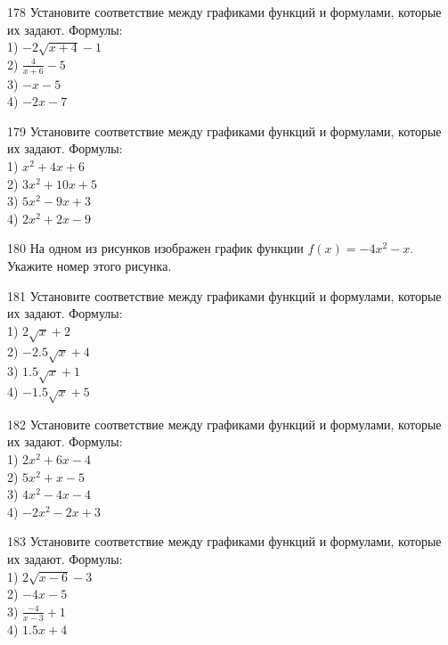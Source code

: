 \documentclass[4apaper]{article}
\begin{document}
\begin{taskBN}{178}
Установите соответствие между графиками функций и формулами, которые их задают. Формулы: \\1) $-2\sqrt{x+4}-1$\\2) $\frac{4}{x+6}-5$\\3) $-x-5$\\4) $-2x-7$
\end{taskBN}

\begin{taskBN}{179}
Установите соответствие между графиками функций и формулами, которые их задают. Формулы: \\1) $x^2+4x+6$\\2) $3x^2+10x+5$\\3) $5x^2-9x+3$\\4) $2x^2+2x-9$
\end{taskBN}

\begin{taskBN}{180}
На одном из рисунков изображен график функции $f(x)=-4x^2-x$. Укажите номер этого рисунка.
\end{taskBN}

\begin{taskBN}{181}
Установите соответствие между графиками функций и формулами, которые их задают. Формулы: \\1) $2\sqrt{x}+2$\\2) $-2.5\sqrt{x}+4$\\3) $1.5\sqrt{x}+1$\\4) $-1.5\sqrt{x}+5$
\end{taskBN}

\begin{taskBN}{182}
Установите соответствие между графиками функций и формулами, которые их задают. Формулы: \\1) $2x^2+6x-4$\\2) $5x^2+x-5$\\3) $4x^2-4x-4$\\4) $-2x^2-2x+3$
\end{taskBN}

\begin{taskBN}{183}
Установите соответствие между графиками функций и формулами, которые их задают. Формулы: \\1) $2\sqrt{x-6}-3$\\2) $-4x-5$\\3) $\frac{-4}{x-3}+1$\\4) $1.5x+4$
\end{taskBN}
\end{document}
